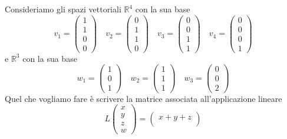\begin{example}
	Consideriamo gli spazi vettoriali $\mathbb{R}^4$ con la sua base
	\begin{equation*}
		v_1 = \begin{pmatrix}
			1 \\ 1 \\ 0 \\ 0
		\end{pmatrix} \quad
		v_2 = \begin{pmatrix}
			0 \\ 1 \\ 1 \\ 0
		\end{pmatrix} \quad
		v_3 = \begin{pmatrix}
			0 \\ 0 \\ 1 \\ 1
		\end{pmatrix} \quad
		v_4 = \begin{pmatrix}
			0 \\ 0 \\ 0 \\ 1
		\end{pmatrix}
	\end{equation*}
	e $\mathbb{R}^3$ con la sua base
	\begin{equation*}
		w_1 = \begin{pmatrix}
			1 \\ 0 \\ 1
		\end{pmatrix} \quad
		w_2 = \begin{pmatrix}
			1 \\ 1 \\ 1
		\end{pmatrix} \quad
		w_3 = \begin{pmatrix}
			0 \\ 0 \\ 2
		\end{pmatrix}
	\end{equation*}
	Quel che vogliamo fare \`e scrivere la matrice associata all'applicazione lineare
	\begin{equation*}
		L \begin{pmatrix}
			x \\ y \\ z \\ w
		\end{pmatrix} = \begin{pmatrix}
			x + y + z \\

\end{pmatrix}
\end{equation*}
\end{example}

